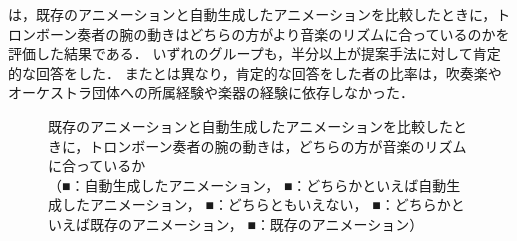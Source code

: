 \par
{}は，既存のアニメーションと自動生成したアニメーションを比較したときに，トロンボーン奏者の腕の動きはどちらの方がより音楽のリズムに合っているのかを評価した結果である．
いずれのグループも，半分以上が提案手法に対して肯定的な回答をした．
またとは異なり，肯定的な回答をした者の比率は，吹奏楽やオーケストラ団体への所属経験や楽器の経験に依存しなかった．
\begin{figure}[!h]
	\centering
	\hspace{5mm}
	\hspace{5mm}
	\caption{既存のアニメーションと自動生成したアニメーションを比較したときに，トロンボーン奏者の腕の動きは，どちらの方が音楽のリズムに合っているか\\
		（{\color{legend1}■}：自動生成したアニメーション，
		{\color{legend2}■}：どちらかといえば自動生成したアニメーション，
		{\color{legend3}■}：どちらともいえない，
		{\color{legend4}■}：どちらかといえば既存のアニメーション，
		{\color{legend5}■}：既存のアニメーション）}
	\label{fig:Q2-3}
\end{figure}
